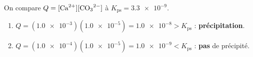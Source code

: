 \documentclass[11pt,a4paper]{article}
\begin{document}
\begin{corrige}
On compare $Q=[\ce{Ca^{2+}}][\ce{CO3^{2-}}]$ à $K_{\mathrm{ps}}=\num{3.3e-9}$.
\begin{enumerate}[label=\alph*)]
  \item $Q = (\num{1.0e-3})(\num{1.0e-5}) = \num{1.0e-8} > K_{\mathrm{ps}}$ : \textbf{précipitation}.
  \item $Q = (\num{1.0e-4})(\num{1.0e-5}) = \num{1.0e-9} < K_{\mathrm{ps}}$ : \textbf{pas} de précipité.
\end{enumerate}
\end{corrige}
\end{document}
